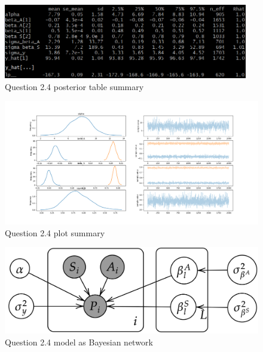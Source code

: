 \documentclass[11pt,a4paper,titlepage]{article}
\begin{document}
\begin{appendices}
    \begin{figure}[htb]
      \centering
        \includegraphics[width=0.95\textwidth]{../q24/q24_table_summary.png}
        \caption{Question 2.4 posterior table summary}
      \label{tab:2.4}
    \end{figure}

    \begin{figure}[htb]
      \centering
        \includegraphics[width=\textwidth]{../q24/q24_plot_summary.png}
        \caption{Question 2.4 plot summary}
      \label{fig:2.4}
    \end{figure}

    \begin{figure}[htb]
      \centering
        \includegraphics[width=\textwidth]{../q24/q24_bnet.png}
        \caption{Question 2.4 model as Bayesian network}
      \label{fig:2.4_bnet}
    \end{figure}
\end{appendices}

\printbibliography
\end{document}

